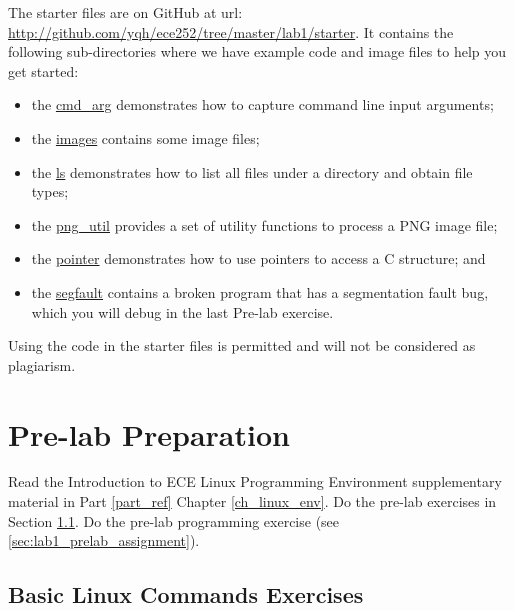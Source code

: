 The starter files are on GitHub at url: \url{http://github.com/yqh/ece252/tree/master/lab1/starter}.
It contains the following sub-directories where we have example code and image files to help you get started:
\begin{itemize}
    \item the \href{http://github.com/yqh/ece252/tree/master/lab1/starter/cmd_arg}{cmd\_arg} demonstrates how to capture command line input arguments;
    \item the \href{http://github.com/yqh/ece252/tree/master/lab1/starter/images}{images} contains some image files;
    \item the \href{http://github.com/yqh/ece252/tree/master/lab1/starter/ls}{ls} demonstrates how to list all files under a directory and obtain file types;
    \item the \href{http://github.com/yqh/ece252/tree/master/lab1/starter/png_util}{png\_util} provides a set of utility functions to process a PNG image file;
    \item the \href{http://github.com/yqh/ece252/tree/master/lab1/starter/pointer}{pointer} demonstrates how to use pointers to access a C structure; and
    \item the \href{http://github.com/yqh/ece252/tree/master/lab1/starter/segfault}{segfault} contains a broken program that has a segmentation fault bug, which you will debug in the last Pre-lab exercise.
\end{itemize}
Using the code in the starter files is permitted and will not be considered as plagiarism.

\section{Pre-lab Preparation}

Read the Introduction to ECE Linux Programming Environment supplementary material in Part \ref{part_ref} Chapter \ref{ch_linux_env}. Do the pre-lab exercises in Section \ref{sec_ex1}. Do the pre-lab programming exercise (see \ref{sec:lab1_prelab_assignment}).
\subsection{Basic Linux Commands Exercises}
\label{sec_ex1}

